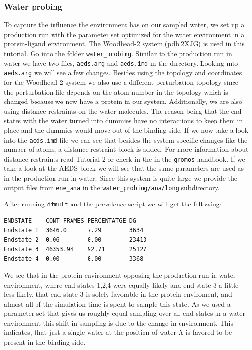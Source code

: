 \subsubsection{Water probing}
To capture the influence the environment has on our sampled water, we set up a production run with the parameter set optimized for the water environment in a protein-ligand environment. The Woodhead-2 system (pdb:2XJG\cite{woodhead2}) is used in this tutorial. Go into the folder \texttt{water\_probing}. Similar to the production run in water we have two files, \texttt{aeds.arg} and \texttt{aeds.imd} in the directory. Looking into \texttt{aeds.arg} we will see a few changes. Besides using the topology and coordinates for the Woodhead-2 system we also use a different perturbation topology since the perturbation file depends on the atom number in the topology which is changed because we now have a protein in our system. Additionally, we are also using distance restraints on the water molecules. The reason being that the end-states with the water turned into dummies have no interactions to keep them in place and the dummies would move out of the binding side. If we now take a look into the \texttt{aeds.imd} file we can see that besides the system-specific changes like the number of atoms, a distance restraint block is added. For more information about distance restraints read Tutorial 2 or check in the in the  \texttt{gromos} handbook. If we take a look at the AEDS block we will see that the same parameters are used as in the production run in water. Since this system is quite large we provide the output files from \texttt{ene\_ana} in the \texttt{water\_probing/ana/long} subdirectory.

After running \texttt{dfmult} and the prevalence script we will get the following:

\begin{lstlisting}
ENDSTATE    CONT_FRAMES PERCENTATGE DG
Endstate 1  3646.0      7.29        3634
Endstate 2  0.06        0.00        23413
Endstate 3  46353.94    92.71       25127
Endstate 4  0.00        0.00        3368
\end{lstlisting}

We see that in the protein environment opposing the production run in water environment, where end-states 1,2,4 were equally likely and end-state 3 a little less likely, that end-state 3 is solely favorable in the protein enviroment, and almost all of the simulation time is spent to sample this state. As we used a parameter set that gives us roughly equal sampling over all end-states in a water environment this shift in sampling is due to the change in environment. This indicates, that just a single water at the position of water A is favored to be present in the binding side. 
